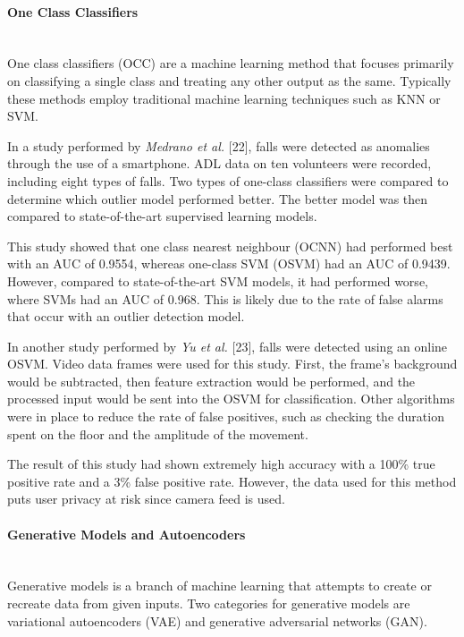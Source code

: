 \paragraph{One Class Classifiers}\mbox{}\\
One class classifiers (OCC) are a machine learning method that focuses primarily on classifying a single class and treating any other output as the same. Typically these methods employ traditional machine learning techniques such as KNN or SVM.

In a study performed by \textit{Medrano et al.} [22], falls were detected as anomalies through the use of a smartphone. ADL data on ten volunteers were recorded, including eight types of falls. Two types of one-class classifiers were compared to determine which outlier model performed better. The better model was then compared to state-of-the-art supervised learning models.

This study showed that one class nearest neighbour (OCNN) had performed best with an AUC of 0.9554, whereas one-class SVM (OSVM) had an AUC of 0.9439. However, compared to state-of-the-art SVM models, it had performed worse, where SVMs had an AUC of 0.968. This is likely due to the rate of false alarms that occur with an outlier detection model. 

In another study performed by \textit{Yu et al.} [23], falls were detected using an online OSVM. Video data frames were used for this study. First, the frame's background would be subtracted, then feature extraction would be performed, and the processed input would be sent into the OSVM for classification. Other algorithms were in place to reduce the rate of false positives, such as checking the duration spent on the floor and the amplitude of the movement.

The result of this study had shown extremely high accuracy with a 100\% true positive rate and a 3\% false positive rate. However, the data used for this method puts user privacy at risk since camera feed is used. 

\paragraph{Generative Models and Autoencoders}\mbox{}\\
Generative models is a branch of machine learning that attempts to create or recreate data from given inputs. Two categories for generative models are variational autoencoders (VAE) and generative adversarial networks (GAN). 

